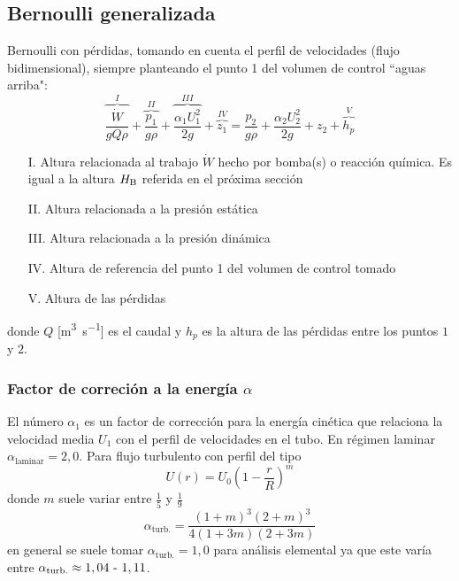 \subsection{Bernoulli generalizada}
Bernoulli con pérdidas, tomando en cuenta el perfil de velocidades (flujo bidimensional), siempre planteando el punto 1 del volumen de control ``aguas arriba":
\begin{equation}\label{eq:bernoulliPerdidas}
    \overbrace{\frac{\dot{W}}{gQ\rho}}^{I}+\overbrace{\frac{p_1}{g\rho}}^{II}+\overbrace{\frac{\alpha_1 U_1^2}{2g}}^{III}+\overbrace{z_1}^{IV}=\frac{p_2}{g\rho}+\frac{\alpha_2 U_2^2}{2g}+z_2+\overbrace{h_p}^{V}
\end{equation}
\begin{itemize}
    \item[I.] Altura relacionada al trabajo $\dot{W}$ hecho por bomba(s) o reacción química. Es igual a la altura $H_{\RM{B}}$ referida en el próxima sección
    \item[II.] Altura relacionada a la presión estática
    \item[III.] Altura relacionada a la presión dinámica
    \item[IV.] Altura de referencia del punto 1 del volumen de control tomado
    \item[V.] Altura de las pérdidas
\end{itemize}
donde $Q$ [\si{\meter \cubed \per \second}] es el caudal y $h_p$ es la altura de las pérdidas entre los puntos $1$ y $2$. 
\subsubsection*{Factor de correción a la energía $\alpha$}
El número $\alpha_1$ es un factor de corrección para la energía cinética que relaciona la velocidad media $U_1$ con el perfil de velocidades en el tubo. En régimen laminar $\alpha_{\textrm{laminar}}=2,0$. Para flujo turbulento con perfil del tipo
\[
U(r)=U_0 \left(1-\frac{r}{R}\right)^{m}
\]
donde $m$ suele variar entre $\frac{1}{5}$ y $\frac{1}{9}$
\[
\alpha_{\textrm{turb.}}=\frac{(1+m)^3(2+m)^3}{4(1+3m)(2+3m)}
\]
en general se suele tomar $\alpha_{\textrm{turb.}}=1,0$ para análisis elemental ya que este varía entre $\alpha_{\textrm{turb.}}\approx 1,04\mbox{ - }1,11$.

